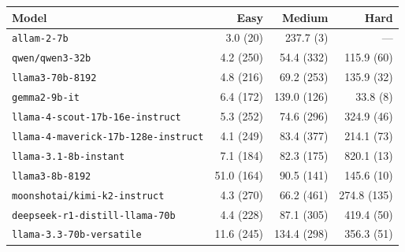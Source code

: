 \begin{tabular}{lrrr}
\hline\hline
\textbf{Model} & \textbf{Easy} & \textbf{Medium} & \textbf{Hard} \\
\hline
\texttt{allam-2-7b} & 3.0 {\scriptsize(20)} & 237.7 {\scriptsize(3)} & --- \\
\texttt{qwen/qwen3-32b} & 4.2 {\scriptsize(250)} & 54.4 {\scriptsize(332)} & 115.9 {\scriptsize(60)} \\
\texttt{llama3-70b-8192} & 4.8 {\scriptsize(216)} & 69.2 {\scriptsize(253)} & 135.9 {\scriptsize(32)} \\
\texttt{gemma2-9b-it} & 6.4 {\scriptsize(172)} & 139.0 {\scriptsize(126)} & 33.8 {\scriptsize(8)} \\
\texttt{llama-4-scout-17b-16e-instruct} & 5.3 {\scriptsize(252)} & 74.6 {\scriptsize(296)} & 324.9 {\scriptsize(46)} \\
\texttt{llama-4-maverick-17b-128e-instruct} & 4.1 {\scriptsize(249)} & 83.4 {\scriptsize(377)} & 214.1 {\scriptsize(73)} \\
\texttt{llama-3.1-8b-instant} & 7.1 {\scriptsize(184)} & 82.3 {\scriptsize(175)} & 820.1 {\scriptsize(13)} \\
\texttt{llama3-8b-8192} & 51.0 {\scriptsize(164)} & 90.5 {\scriptsize(141)} & 145.6 {\scriptsize(10)} \\
\texttt{moonshotai/kimi-k2-instruct} & 4.3 {\scriptsize(270)} & 66.2 {\scriptsize(461)} & 274.8 {\scriptsize(135)} \\
\texttt{deepseek-r1-distill-llama-70b} & 4.4 {\scriptsize(228)} & 87.1 {\scriptsize(305)} & 419.4 {\scriptsize(50)} \\
\texttt{llama-3.3-70b-versatile} & 11.6 {\scriptsize(245)} & 134.4 {\scriptsize(298)} & 356.3 {\scriptsize(51)} \\
\hline\hline
\end{tabular}

